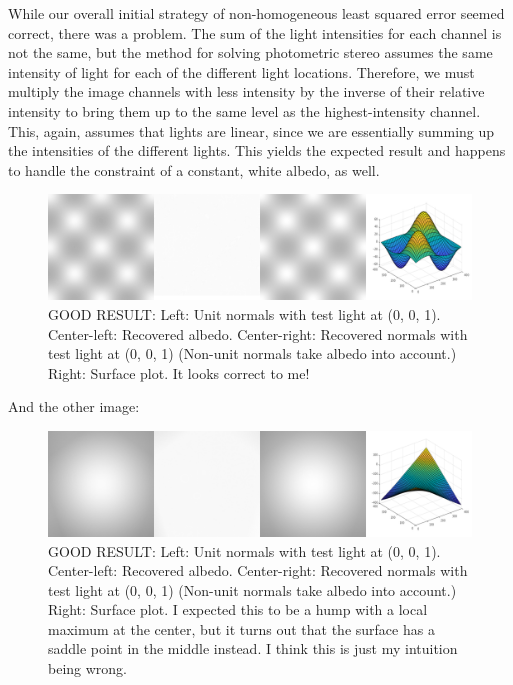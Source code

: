 \documentclass{article}
\begin{document}
While our overall initial strategy of non-homogeneous least squared error seemed 
correct, there was a problem. The sum of the 
light intensities for each channel is not the same, but the method for solving 
photometric stereo assumes the same intensity of light for each of the different 
light locations. Therefore, we must multiply the image channels with less 
intensity by the inverse of their relative intensity to bring them up to the 
same level as the highest-intensity channel. This, again, assumes that lights 
are linear, since we are essentially summing up the intensities of the different 
lights. This yields the expected result and happens to handle the constraint of 
a constant, white albedo, as well.

\begin{figure}[!ht]
	\centering
	\includegraphics[width=160mm]{figs/q2_im2_good_all_figs.png}
	\caption{GOOD RESULT: Left: Unit normals with test light at (0, 0, 1). Center-left: 
        Recovered albedo. Center-right: Recovered normals with test light at (0, 
        0, 1) (Non-unit normals take albedo into account.) Right: Surface plot. 
        It looks correct to me!}
\end{figure}

And the other image:

\begin{figure}[!ht]
	\centering
	\includegraphics[width=160mm]{figs/q2_im1_good_all_figs.png}
	\caption{GOOD RESULT: Left: Unit normals with test light at (0, 0, 1). Center-left: 
        Recovered albedo. Center-right: Recovered normals with test light at (0, 
        0, 1) (Non-unit normals take albedo into account.) Right: Surface plot. 
        I expected this to be a hump with a local maximum at the center, but it 
        turns out that the surface has a saddle point in the middle instead. I 
        think this is just my intuition being wrong.}
\end{figure}
\end{document}

